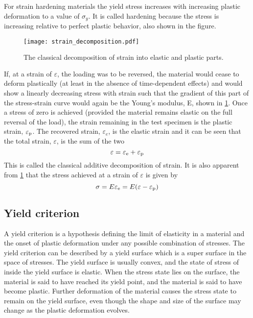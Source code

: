 For strain hardening materials the yield stress increases with increasing plastic deformation to a value of $\sigma_y$.
It is called hardening because the stress is increasing relative to perfect plastic behavior, also shown in the figure.
\begin{figure}[ht]
    \centering
    \texttt{[image: strain\_decomposition.pdf]}
    \caption{The classical decomposition of strain into elastic and plastic parts.}
    \label{Fig:strain_decomposition}
\end{figure}
If, at a strain of $\varepsilon$, the loading was to be reversed, the material would cease to deform plastically (at least in the absence of time-dependent effects) and would show a linearly decreasing stress with strain such that the gradient of this part of the stress-strain curve would again be the Young's modulus, E, shown in \ref{Fig:strain_decomposition}.
Once a stress of zero is achieved (provided the material remains elastic on the full reversal of the load), the strain remaining in the test specimen is the plastic strain, $\varepsilon_{\rm{p}}$.
The recovered strain, $\varepsilon_e$, is the elastic strain and it can be seen that the total strain, $\varepsilon$, is the sum of the two
\begin{equation}
\varepsilon = \varepsilon_{\rm{e}} + \varepsilon_{\rm{p}}
\end{equation}
This is called the classical additive decomposition of strain.
It is also apparent from \ref{Fig:strain_decomposition} that the stress achieved at a strain of $\varepsilon$ is given by
\begin{equation}
\sigma = E\varepsilon_{\rm{e}} = E(\varepsilon - \varepsilon_{\rm{p}})
\end{equation}

\subsection{Yield criterion}
\noindent
A yield criterion is a hypothesis defining the limit of elasticity in a material and the onset of plastic deformation under any possible combination of stresses.
The yield criterion can be described by a yield surface which is a super surface in the space of stresses.
The yield surface is usually convex, and the state of stress of inside the yield surface is elastic.
When the stress state lies on the surface, the material is said to have reached its yield point, and the material is said to have become plastic.
Further deformation of the material causes the stress state to remain on the yield surface, even though the shape and size of the surface may change as the plastic deformation evolves.

